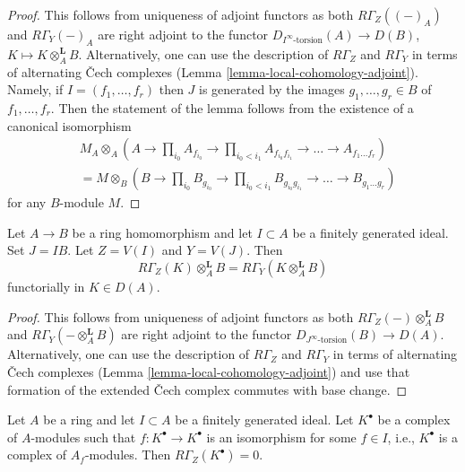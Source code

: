 \begin{proof}
This follows from uniqueness of adjoint functors as both
$R\Gamma_Z((-)_A)$ and $R\Gamma_Y(-)_A$
are right adjoint to the functor $D_{I^\infty\text{-torsion}}(A) \to D(B)$,
$K \mapsto K \otimes_A^\mathbf{L} B$.
Alternatively, one can use the description of $R\Gamma_Z$ and $R\Gamma_Y$
in terms of alternating {\v C}ech complexes
(Lemma \ref{lemma-local-cohomology-adjoint}).
Namely, if $I = (f_1, \ldots, f_r)$ then $J$ is generated by the images
$g_1, \ldots, g_r \in B$ of $f_1, \ldots, f_r$.
Then the statement of the lemma follows from the existence of
a canonical isomorphism
\begin{align*}
& M_A \otimes_A (A \to \prod\nolimits_{i_0} A_{f_{i_0}} \to
\prod\nolimits_{i_0 < i_1} A_{f_{i_0}f_{i_1}}
\to \ldots \to A_{f_1\ldots f_r}) \\
& = 
M \otimes_B (B \to \prod\nolimits_{i_0} B_{g_{i_0}} \to
\prod\nolimits_{i_0 < i_1} B_{g_{i_0}g_{i_1}}
\to \ldots \to B_{g_1\ldots g_r})
\end{align*}
for any $B$-module $M$.
\end{proof}

\begin{lemma}
\label{lemma-torsion-change-rings}
Let $A \to B$ be a ring homomorphism and let $I \subset A$
be a finitely generated ideal. Set $J = IB$. Let $Z = V(I)$ and $Y = V(J)$.
Then
$$
R\Gamma_Z(K) \otimes_A^\mathbf{L} B = R\Gamma_Y(K \otimes_A^\mathbf{L} B)
$$
functorially in $K \in D(A)$.
\end{lemma}

\begin{proof}
This follows from uniqueness of adjoint functors
as both $R\Gamma_Z( - ) \otimes_A^\mathbf{L} B$ and
$R\Gamma_Y(- \otimes_A^\mathbf{L} B)$
are right adjoint to the functor
$D_{J^\infty\text{-torsion}}(B) \to D(A)$. Alternatively, one can use
the description of $R\Gamma_Z$ and $R\Gamma_Y$ in terms of alternating
{\v C}ech complexes (Lemma \ref{lemma-local-cohomology-adjoint})
and use that formation of the extended {\v C}ech
complex commutes with base change.
\end{proof}

\begin{lemma}
\label{lemma-local-cohomology-vanishes}
Let $A$ be a ring and let $I \subset A$ be a finitely generated ideal.
Let $K^\bullet$ be a complex of $A$-modules such that
$f : K^\bullet \to K^\bullet$ is an isomorphism for some
$f \in I$, i.e., $K^\bullet$ is a complex of $A_f$-modules. Then
$R\Gamma_Z(K^\bullet) = 0$.
\end{lemma}

